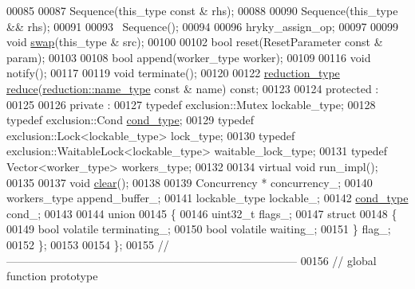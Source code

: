 \begin{DoxyCode}
00085 
00087     Sequence(this\_type \textcolor{keyword}{const} & rhs);
00088 
00090     Sequence(this\_type && rhs);
00091 
00093     ~Sequence();
00094 
00096     hryky\_assign\_op;
00097 
00099     \textcolor{keywordtype}{void} \hyperlink{namespacehryky_a4282146df5ea2b68cb667896a2205909}{swap}(this\_type & src);
00100 
00102     \textcolor{keywordtype}{bool} reset(ResetParameter \textcolor{keyword}{const} & param);
00103 
00108     \textcolor{keywordtype}{bool} append(worker\_type worker);
00109 
00116     \textcolor{keywordtype}{void} notify();
00117 
00119     \textcolor{keywordtype}{void} terminate();
00120 
00122     \hyperlink{namespacehryky_a343a9a4c36a586be5c2693156200eadc}{reduction_type} \hyperlink{namespacehryky_af41cb3af6766761da0ff21b84527a52c}{reduce}(\hyperlink{namespacehryky_1_1reduction_ac686c30a4c8d196bbd0f05629a6b921f}{reduction::name_type} \textcolor{keyword}{const} & name) \textcolor{keyword}{const};
00123 
00124 \textcolor{keyword}{protected} :
00125 
00126 \textcolor{keyword}{private} :
00127     \textcolor{keyword}{typedef} exclusion::Mutex                        lockable\_type;
00128     \textcolor{keyword}{typedef} exclusion::Cond                         \hyperlink{namespacehryky_1_1exclusion_ad55c6711217e878a379eed07ea146e3c}{cond_type};
00129     \textcolor{keyword}{typedef} exclusion::Lock<lockable\_type>          lock\_type;
00130     \textcolor{keyword}{typedef} exclusion::WaitableLock<lockable\_type>  waitable\_lock\_type;
00131     \textcolor{keyword}{typedef} Vector<worker\_type>                     workers\_type;
00132 
00134     \textcolor{keyword}{virtual} \textcolor{keywordtype}{void} run\_impl();
00135 
00137     \textcolor{keywordtype}{void} \hyperlink{namespacehryky_aa201297ea9530da954a7230be71cc19d}{clear}();
00138 
00139     Concurrency *                   concurrency\_;
00140     workers\_type                    append\_buffer\_;
00141     lockable\_type                   lockable\_;
00142     \hyperlink{namespacehryky_1_1exclusion_ad55c6711217e878a379eed07ea146e3c}{cond_type}                       cond\_;
00143 
00144     \textcolor{keyword}{union}
00145     \{
00146         uint32\_t flags\_;
00147         \textcolor{keyword}{struct}
00148         \{
00149             \textcolor{keywordtype}{bool} \textcolor{keyword}{volatile} terminating\_;
00150             \textcolor{keywordtype}{bool} \textcolor{keyword}{volatile} waiting\_;
00151         \} flag\_;
00152     \};
00153 
00154 \};
00155 \textcolor{comment}{//
      ------------------------------------------------------------------------------}
00156 \textcolor{comment}{// global function prototype}

\end{DoxyCode}
